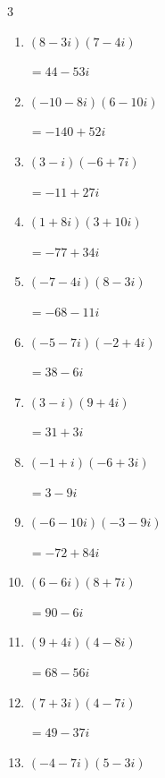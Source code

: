 \begin{multicols}{3}
\begin{enumerate}
        $\displaystyle =-59-2i$

  \item $\displaystyle (8-3i)(7-4i)$

        $\displaystyle =44-53i$

  \item $\displaystyle (-10-8i)(6-10i)$

        $\displaystyle =-140+52i$

  \item $\displaystyle (3-i)(-6+7i)$

        $\displaystyle =-11+27i$

  \item $\displaystyle (1+8i)(3+10i)$

        $\displaystyle =-77+34i$

  \item $\displaystyle (-7-4i)(8-3i)$

        $\displaystyle =-68-11i$

  \item $\displaystyle (-5-7i)(-2+4i)$

        $\displaystyle =38-6i$

  \item $\displaystyle (3-i)(9+4i)$

        $\displaystyle =31+3i$

  \item $\displaystyle (-1+i)(-6+3i)$

        $\displaystyle =3-9i$

  \item $\displaystyle (-6-10i)(-3-9i)$

        $\displaystyle =-72+84i$

  \item $\displaystyle (6-6i)(8+7i)$

        $\displaystyle =90-6i$

\columnbreak %

\resetques

  \item $\displaystyle (9+4i)(4-8i)$

        $\displaystyle =68-56i$

  \item $\displaystyle (7+3i)(4-7i)$

        $\displaystyle =49-37i$

  \item $\displaystyle (-4-7i)(5-3i)$


\end{enumerate}
\end{multicols}
